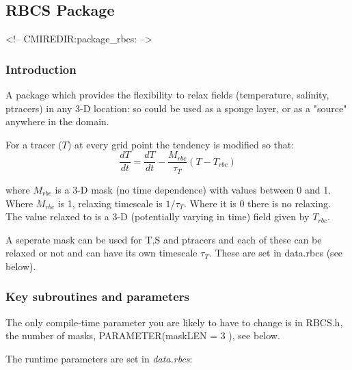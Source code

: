 \subsection {RBCS Package} 
\label{sec:pkg:rbcs}
\begin{rawhtml}
<!-- CMIREDIR:package_rbcs: -->
\end{rawhtml}

\subsubsection {Introduction}

A package which provides the flexibility
to relax fields (temperature, salinity, ptracers)
in any 3-D location:
so could be used as a sponge layer, or as a
"source" anywhere in the domain.

\noindent
For a tracer ($T$) at every grid point the tendency is modified so that:
\[
\frac{dT}{dt}=\frac{dT}{dt} - \frac{M_{rbc}}{\tau_T} (T-T_{rbc})
\]

\noindent
where $M_{rbc}$ is a 3-D mask (no time dependence) with
values between 0 and 1. Where $M_{rbc}$ is 1, relaxing timescale
is $1/\tau_T$. Where it is 0 there is no relaxing.
The value relaxed to is a 3-D (potentially varying in
time) field given by $T_{rbc}$. 

A seperate mask can be used for T,S and ptracers and
each of these
can be relaxed or not and can have its own timescale
$\tau_T$. These are set in data.rbcs (see below).


\subsubsection {Key subroutines and parameters}

The only compile-time parameter you are likely to have to change is in {RBCS.h},
the number of masks, PARAMETER(maskLEN = 3 ), see below.

The runtime parameters are set in {\it data.rbcs}:

